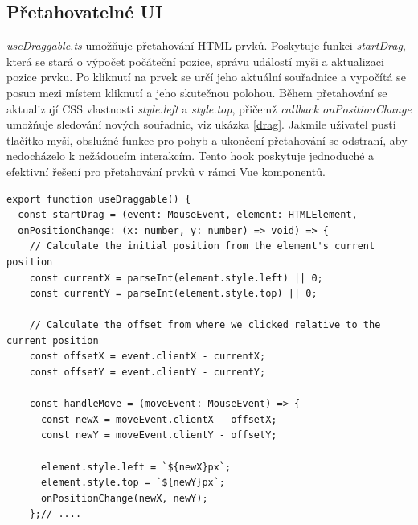 \subsection{Přetahovatelné UI}
\textit{useDraggable.ts} umožňuje přetahování HTML prvků. Poskytuje funkci \textit{startDrag}, která se stará o výpočet počáteční pozice, správu událostí myši a aktualizaci pozice prvku. Po kliknutí na prvek se určí jeho aktuální souřadnice a vypočítá se posun mezi místem kliknutí a jeho skutečnou polohou. Během přetahování se aktualizují CSS vlastnosti \textit{style.left} a \textit{style.top}, přičemž \textit{callback onPositionChange} umožňuje sledování nových souřadnic, viz ukázka \ref{drag}. Jakmile uživatel pustí tlačítko myši, obslužné funkce pro pohyb a ukončení přetahování se odstraní, aby nedocházelo k nežádoucím interakcím. Tento hook poskytuje jednoduché a efektivní řešení pro přetahování prvků v rámci Vue komponentů.\cite{draggable}
\begin{lstlisting}[style=JavaScript, firstnumber = 1, caption={utils/useDraggable.ts, přetahovatelné UI},
label = {drag}]
export function useDraggable() {
  const startDrag = (event: MouseEvent, element: HTMLElement,
  onPositionChange: (x: number, y: number) => void) => {
    // Calculate the initial position from the element's current position
    const currentX = parseInt(element.style.left) || 0;
    const currentY = parseInt(element.style.top) || 0;
    
    // Calculate the offset from where we clicked relative to the current position
    const offsetX = event.clientX - currentX;
    const offsetY = event.clientY - currentY;

    const handleMove = (moveEvent: MouseEvent) => {
      const newX = moveEvent.clientX - offsetX;
      const newY = moveEvent.clientY - offsetY;
      
      element.style.left = `${newX}px`;
      element.style.top = `${newY}px`;
      onPositionChange(newX, newY);
    };// ....
\end{lstlisting}